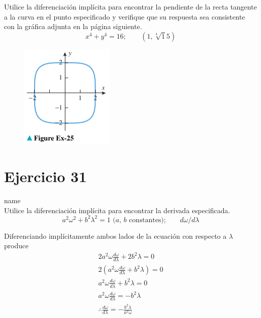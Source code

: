 \documentclass[12pt]{article}
\begin{document}
Utilice la diferenciación implícita para encontrar la pendiente de la recta tangente a la curva en el punto especificado y verifique que su respuesta sea consistente con la gráfica adjunta en la página siguiente.
\begin{equation*}
x^4+y^4=16; \qquad (1, \sqrt[4]15)
\end{equation*}
\begin{figure}[H]
\centering
\includegraphics[width=0.4\textwidth]{../img/img_Lista2/3_25.png}
\end{figure}

\section{Ejercicio 31} name \\

Utilice la diferenciación implícita para encontrar la derivada especificada.
\[ a^2 \omega^2 + b^2 \lambda^2 = 1 \text{ ($a$, $b$ constantes);}\qquad d\omega /d\lambda \]

Diferenciando implícitamente ambos lados de la ecuación con respecto a $\lambda$ produce
\begin{align*}
  2a^2\omega \frac{d\omega}{d\lambda}+2b^2\lambda=0\\
  2(a^2\omega \frac{d\omega}{d\lambda}+b^2\lambda)=0\\
  a^2\omega \frac{d\omega}{d\lambda}+b^2\lambda=0\\
  a^2\omega \frac{d\omega}{d\lambda}=-b^2\lambda\\
  \therefore \frac{d\omega}{d\lambda}=-\frac{b^2\lambda}{a^2\omega}\\
\end{align*}
\end{document}

